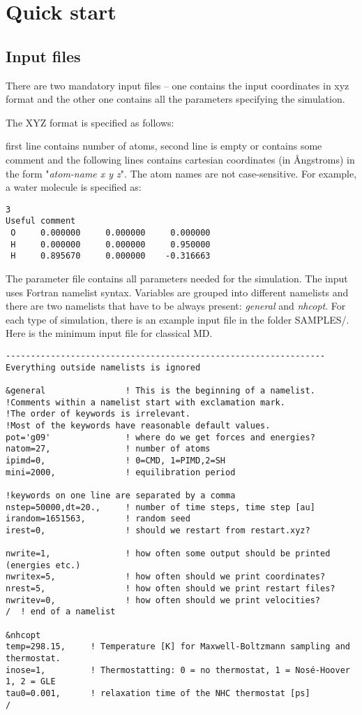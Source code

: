 \section{Quick start}
\subsection{Input files}

There are two mandatory input files -- one contains the input coordinates in xyz format and the other one contains all the parameters specifying the simulation.

The XYZ format is specified as follows:

first line contains number of atoms, second line is empty or contains some comment and the following lines contains cartesian coordinates (in \AA ngstroms) in the form "\textit{atom-name	x y z}". The atom names are not case-sensitive. For example, a water molecule is specified as:

\begin{verbatim}
3
Useful comment
 O     0.000000     0.000000     0.000000
 H     0.000000     0.000000     0.950000
 H     0.895670     0.000000    -0.316663
\end{verbatim}

The parameter file contains all parameters needed for the simulation.
The input uses Fortran namelist syntax.
Variables are grouped into different namelists and there are two namelists that have to be always present: \textit{general} and \textit{nhcopt}. For each type of simulation, there is an example input file in
the folder SAMPLES/. Here is the minimum input file for classical MD.

\begin{verbatim}
----------------------------------------------------------------
Everything outside namelists is ignored

&general                ! This is the beginning of a namelist.
!Comments within a namelist start with exclamation mark.
!The order of keywords is irrelevant.
!Most of the keywords have reasonable default values.
pot='g09'               ! where do we get forces and energies?
natom=27,               ! number of atoms
ipimd=0,                ! 0=CMD, 1=PIMD,2=SH
mini=2000,              ! equilibration period

!keywords on one line are separated by a comma
nstep=50000,dt=20.,     ! number of time steps, time step [au]
irandom=1651563,        ! random seed
irest=0,                ! should we restart from restart.xyz?

nwrite=1,               ! how often some output should be printed (energies etc.)
nwritex=5,              ! how often should we print coordinates?
nrest=5,                ! how often should we print restart files?
nwritev=0,              ! how often should we print velocities?
/  ! end of a namelist

&nhcopt
temp=298.15,     ! Temperature [K] for Maxwell-Boltzmann sampling and thermostat.
inose=1,         ! Thermostatting: 0 = no thermostat, 1 = Nosé-Hoover 1, 2 = GLE
tau0=0.001,      ! relaxation time of the NHC thermostat [ps]
/

\end{verbatim}

